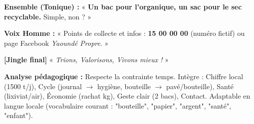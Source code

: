 \documentclass[11pt]{article}
\begin{document}
\begin{exoresolu}
\textbf{Ensemble (Tonique) :} « \textbf{Un bac pour l'organique, un sac pour le sec recyclable.} Simple, non ? »

\textbf{Voix Homme :} « Points de collecte et infos : \textbf{15 00 00 00} (numéro fictif) ou page Facebook \textit{Yaoundé Propre}. »

\textbf{[Jingle final]} « \textit{Trions, Valorisons, Vivons mieux !} »

\textbf{Analyse pédagogique :} Respecte la contrainte temps. Intègre : Chiffre local (1500 t/j), Cycle (journal $\rightarrow$ hygiène, bouteille $\rightarrow$ pavé/bouteille), Santé (lixiviat/air), Économie (rachat kg), Geste clair (2 bacs), Contact. Adaptable en langue locale (vocabulaire courant : "bouteille", "papier", "argent", "santé", "enfant").
\end{exoresolu}
\end{document}
